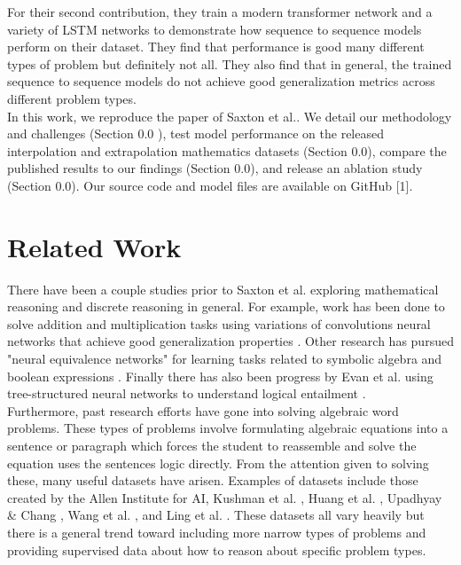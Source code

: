 For their second contribution, they train a modern transformer network and a variety of LSTM networks \supercite{hochreiter1997long} to demonstrate how sequence to sequence models perform on their dataset. They find that performance is good many different types of problem but definitely not all. They also find that in general, the trained sequence to sequence models do not achieve good generalization metrics across different problem types.  \\ 


In this work, we reproduce the paper of Saxton et al.\supercite{DBLP:journals/corr/abs-1904-01557}. We detail our methodology and challenges (Section 0.0 ), test model performance on the released interpolation and extrapolation mathematics datasets (Section 0.0), compare the published results to our findings (Section 0.0),  and release an ablation study (Section 0.0).  Our source code and model files are available on GitHub [1].


\section{Related Work}

There have been a couple studies prior to Saxton et al. \supercite{DBLP:journals/corr/abs-1904-01557} exploring mathematical reasoning and discrete reasoning in general. For example, work has been done to solve addition and multiplication tasks using variations of convolutions neural networks that achieve good generalization properties \supercite{kaiser2015neural}. Other research has pursued "neural equivalence networks" for learning tasks related to symbolic algebra and boolean expressions \supercite{allamanis2017learning}. Finally there has also been progress by Evan et al. using tree-structured neural networks to understand logical entailment \supercite{evans2018neural}.   \\

Furthermore, past research efforts have gone into solving algebraic word problems. These types of problems involve formulating algebraic equations into a sentence or paragraph which forces the student to reassemble and solve the equation uses the sentences logic directly. From the attention given to solving these, many useful datasets have arisen. Examples of datasets include those created by the Allen Institute for AI, Kushman et al. \supercite{kushman2014learning}, Huang et al. \supercite{huang2016well},  Upadhyay \& Chang \supercite{upadhyay2016annotating}, Wang et al. \supercite{wang2017deep}, and Ling et al. \supercite{ling2017program}. These datasets all vary heavily but there is a general trend toward including more narrow types of problems and providing supervised data about how to reason about specific problem types.  \\


